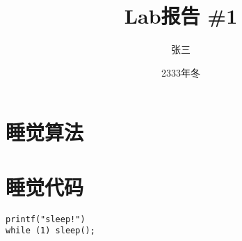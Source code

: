 \documentclass{article}
\title{\bfseries Lab报告 \#1}
\author{张三 \quad 2332332333}
\date{2333年冬}
\begin{document}
	\maketitle
    \pagestyle{plain}
    \tableofcontents

    \section{睡觉算法}
    \begin{algorithm}[H]
    \end{algorithm}

    \section{睡觉代码}
    \begin{center}
        \begin{lstlisting}
printf("sleep!")
while (1) sleep();
        \end{lstlisting}
    \end{center}
\end{document}

